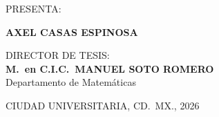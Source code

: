 \begin{titlepage}
\begin{center}
P\hspace{0.4em}R\hspace{0.4em}E\hspace{0.4em}S\hspace{0.4em}E\hspace{0.4em}N\hspace{0.4em}T\hspace{0.4em}A:

\vspace{0.4cm}

{\large\bfseries AXEL CASAS ESPINOSA}

\vspace{1.4cm}

\begin{minipage}{0.85\textwidth}
\centering
DIRECTOR DE TESIS: \\[0.4em]
{\large\bfseries M.\ en C.I.C.\ MANUEL SOTO ROMERO} \\[0.3em]
{\small Departamento de Matemáticas}
\end{minipage}

\vfill

CIUDAD UNIVERSITARIA, CD.\ MX., 2026

\end{center}
\end{titlepage}
\cleardoublepage
